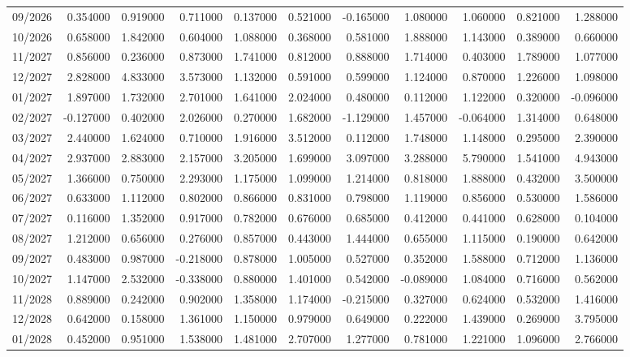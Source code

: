 \begin{tabular}{lrrrrrrrrrr}
09/2026 & 0.354000 & 0.919000 & 0.711000 & 0.137000 & 0.521000 & -0.165000 & 1.080000 & 1.060000 & 0.821000 & 1.288000 \\
10/2026 & 0.658000 & 1.842000 & 0.604000 & 1.088000 & 0.368000 & 0.581000 & 1.888000 & 1.143000 & 0.389000 & 0.660000 \\
11/2027 & 0.856000 & 0.236000 & 0.873000 & 1.741000 & 0.812000 & 0.888000 & 1.714000 & 0.403000 & 1.789000 & 1.077000 \\
12/2027 & 2.828000 & 4.833000 & 3.573000 & 1.132000 & 0.591000 & 0.599000 & 1.124000 & 0.870000 & 1.226000 & 1.098000 \\
01/2027 & 1.897000 & 1.732000 & 2.701000 & 1.641000 & 2.024000 & 0.480000 & 0.112000 & 1.122000 & 0.320000 & -0.096000 \\
02/2027 & -0.127000 & 0.402000 & 2.026000 & 0.270000 & 1.682000 & -1.129000 & 1.457000 & -0.064000 & 1.314000 & 0.648000 \\
03/2027 & 2.440000 & 1.624000 & 0.710000 & 1.916000 & 3.512000 & 0.112000 & 1.748000 & 1.148000 & 0.295000 & 2.390000 \\
04/2027 & 2.937000 & 2.883000 & 2.157000 & 3.205000 & 1.699000 & 3.097000 & 3.288000 & 5.790000 & 1.541000 & 4.943000 \\
05/2027 & 1.366000 & 0.750000 & 2.293000 & 1.175000 & 1.099000 & 1.214000 & 0.818000 & 1.888000 & 0.432000 & 3.500000 \\
06/2027 & 0.633000 & 1.112000 & 0.802000 & 0.866000 & 0.831000 & 0.798000 & 1.119000 & 0.856000 & 0.530000 & 1.586000 \\
07/2027 & 0.116000 & 1.352000 & 0.917000 & 0.782000 & 0.676000 & 0.685000 & 0.412000 & 0.441000 & 0.628000 & 0.104000 \\
08/2027 & 1.212000 & 0.656000 & 0.276000 & 0.857000 & 0.443000 & 1.444000 & 0.655000 & 1.115000 & 0.190000 & 0.642000 \\
09/2027 & 0.483000 & 0.987000 & -0.218000 & 0.878000 & 1.005000 & 0.527000 & 0.352000 & 1.588000 & 0.712000 & 1.136000 \\
10/2027 & 1.147000 & 2.532000 & -0.338000 & 0.880000 & 1.401000 & 0.542000 & -0.089000 & 1.084000 & 0.716000 & 0.562000 \\
11/2028 & 0.889000 & 0.242000 & 0.902000 & 1.358000 & 1.174000 & -0.215000 & 0.327000 & 0.624000 & 0.532000 & 1.416000 \\
12/2028 & 0.642000 & 0.158000 & 1.361000 & 1.150000 & 0.979000 & 0.649000 & 0.222000 & 1.439000 & 0.269000 & 3.795000 \\
01/2028 & 0.452000 & 0.951000 & 1.538000 & 1.481000 & 2.707000 & 1.277000 & 0.781000 & 1.221000 & 1.096000 & 2.766000 \\

\end{tabular}
